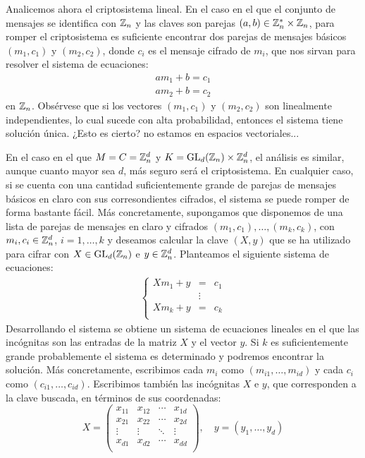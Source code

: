 Analicemos ahora el criptosistema lineal. En el caso en el que el conjunto de mensajes se identifica con $\mathbb{Z}_n$ y las claves son parejas $(a,b)\in\mathbb{Z}^*_n\times\mathbb{Z}_n$, para romper el criptosistema es suficiente encontrar dos parejas de mensajes básicos $(m_1,c_1)$ y $(m_2,c_2)$, donde $c_i$ es el mensaje cifrado de $m_i$, que nos sirvan para resolver el sistema de ecuaciones:
\begin{gather*}
    am_1 + b = c_1 \\
    am_2 + b = c_2
\end{gather*}
en $\mathbb{Z}_n$. Obsérvese que si los vectores $(m_1,c_1)$ y $(m_2, c_2)$ son linealmente independientes, lo cual sucede con alta probabilidad, entonces el sistema tiene solución única. ¿Esto es cierto? no estamos en espacios vectoriales...

En el caso en el que $M=C=\mathbb{Z}_n^d$ y $K=\operatorname{\rm GL}_d(\mathbb{Z}_n)\times\mathbb{Z}_n^d$, el análisis es similar, aunque cuanto mayor sea $d$, más seguro será el criptosistema. En cualquier caso, si se cuenta con una cantidad suficientemente grande de parejas de mensajes básicos en claro con sus corresondientes cifrados, el sistema se puede romper de forma bastante fácil. Más concretamente, supongamos que disponemos de una lista de parejas de mensajes en claro y cifrados $(m_1,c_1),\dots,(m_k,c_k)$, con $m_i,c_i\in\mathbb{Z}_n^d$, $i=1,\dots,k$ y deseamos calcular la clave $(X,y)$ que se ha utilizado para cifrar con $X\in\operatorname{\rm GL}_d(\mathbb{Z}_n)$ e $y\in\mathbb{Z}_n^d$. Planteamos el siguiente sistema de ecuaciones:
\begin{align*}
    \left\{
        \begin{array}{lcl}
             Xm_1 + y & =      & c_1 \\
                      & \vdots & \\
             Xm_k + y & =      & c_k \\
        \end{array}
    \right.
\end{align*}
Desarrollando el sistema se obtiene un sistema de ecuaciones lineales en el que las incógnitas son las entradas de la matriz $X$ y el vector $y$. Si $k$ es suficientemente grande probablemente el sistema es determinado y podremos encontrar la solución. Más concretamente, escribimos cada $m_i$ como $(m_{i1},\dots,m_{id})$ y cada $c_i$ como $(c_{i1},\dots,c_{id})$. Escribimos también las incógnitas $X$ e $y$, que corresponden a la clave buscada, en términos de sus coordenadas:
$$X=\begin{pmatrix}
    x_{11} & x_{12} & \cdots & x_{1d} \\
    x_{21} & x_{22} & \cdots & x_{2d} \\
    \vdots & \vdots & \ddots & \vdots \\
    x_{d1} & x_{d2} & \cdots & x_{dd} \\
\end{pmatrix}, \quad y=(y_1,\dots,y_d)$$
